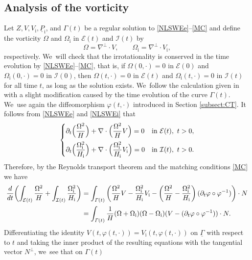 \documentclass[11pt]{article}
\newcommand{\dt}{\partial_t}
\newcommand{\cI}{{\mathcal I}}
\newcommand{\cE}{{\mathcal E}}
\newcommand{\ul}[1]{\underline{#1}}
\newcommand{\itGamma}{\mathit{\Gamma}}
\theoremstyle{definition}
\begin{document}
\subsection{Analysis of the vorticity}\label{sectvort}
Let $Z,V,V_\mathrm{i},\ul{P}_\mathrm{i}$, and $\itGamma(t)$ be a regular solution to \eqref{NLSWEe}--\eqref{MC} and define the vorticity $\Omega$
and $\Omega_\mathrm{i}$ in $\cE(t)$ and $\cI(t)$ by
\[
\Omega = \nabla^\perp\cdot V, \qquad \Omega_\mathrm{i} = \nabla^\perp\cdot V_\mathrm{i},
\]
respectively. We~will check that the irrotationality is conserved in the time evolution by \eqref{NLSWEe}--\eqref{MC}, that is,
if $\Omega(0,\cdot)=0$ in $\cE(0)$ and $\Omega_\mathrm{i}(0,\cdot)=0$ in $\cI(0)$,
then $\Omega(t,\cdot)=0$ in $\cE(t)$ and $\Omega_\mathrm{i}(t,\cdot)=0$ in $\cI(t)$ for all time $t$, as long as the solution exists. We~follow the calculation given in \cite[Section 2.4]{IguchiLannes2023} with a slight modification caused by the time evolution of the curve $\itGamma(t)$. We~use again the diffeomorphism $\varphi(t,\cdot)$ introduced in Section \ref{subsect:CT}.
It follows from \eqref{NLSWEe} and \eqref{NLSWEi} that
\[
\begin{cases}
\dt\Bigl(\dfrac{\Omega^2}{H}\Bigr) + \nabla\cdot\Bigl(\dfrac{\Omega^2}{H}V\Bigr)=0 &\text{in } \cE(t), \ t>0, \\[8pt]
\dt\Bigl(\dfrac{\Omega_\mathrm{i}^2}{H_\mathrm{i}}\Bigr)
+ \nabla\cdot\Bigl(\dfrac{\Omega_\mathrm{i}^2}{H_\mathrm{i}}V_\mathrm{i}\Bigr)=0 &\text{in } \cI(t), \ t>0.
\end{cases}
\]
Therefore, by the Reynolds transport theorem and the matching conditions \eqref{MC} we have
\begin{align}
\frac{\rm d}{{\rm d}t}\biggl(\int_{\cE(t)}\frac{\Omega^2}{H} + \int_{\cI(t)}\frac{\Omega_\mathrm{i}^2}{H_\mathrm{i}} \biggr)
&= \int_{\itGamma(t)} \left(\frac{\Omega^2}{H}V - \frac{\Omega_\mathrm{i}^2}{H_\mathrm{i}}V_\mathrm{i}
- \left(\frac{\Omega^2}{H} - \frac{\Omega_\mathrm{i}^2}{H_\mathrm{i}} \right)(\dt\varphi\circ\varphi^{-1}) \right)\cdot N \notag\\
\label{vorticity}
\\[-15pt]
&= \int_{\itGamma(t)} \frac{1}{H}(\Omega+\Omega_\mathrm{i})(\Omega-\Omega_\mathrm{i})(V-(\dt\varphi\circ\varphi^{-1}))\cdot N.\notag
\end{align}
Differentiating the identity $V(t,\varphi(t,\cdot))=V_\mathrm{i}(t,\varphi(t,\cdot))$ on $\ul{\itGamma}$ with respect to $t$ and taking the inner product of the
resulting equations with the tangential vector $N^\perp$, we~see that on $\itGamma(t)$
\end{document}

